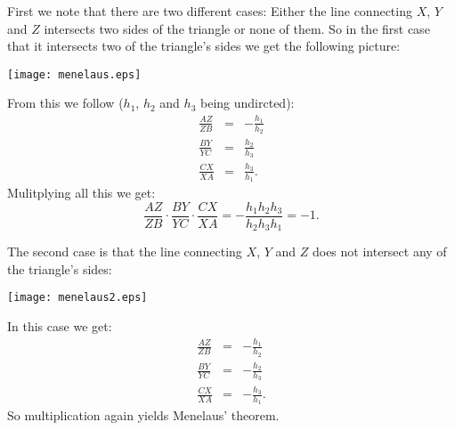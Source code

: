\documentclass[12pt]{article}
\begin{document}
First we note that there are two different cases: Either the line connecting $X$, $Y$ and $Z$ intersects two sides of the triangle or none of them. So in the first case that it intersects two of the triangle's sides we get the following picture:
\begin{center}
\texttt{[image: menelaus.eps]}
\end{center}
From this we follow ($h_1$, $h_2$ and $h_3$ being undircted):
\begin{eqnarray*}
\frac{AZ}{ZB}& = &-\frac{h_1}{h_2}\\
\frac{BY}{YC} & = & \frac{h_2}{h_3}\\
\frac{CX}{XA} & = & \frac{h_3}{h_1}.
\end{eqnarray*}
Mulitplying all this we get:
$$\frac{AZ}{ZB}\cdot\frac{BY}{YC}\cdot\frac{CX}{XA} = -\frac{h_1h_2h_3}{h_2h_3h_1} = -1.$$

The second case is that the line connecting $X$, $Y$ and $Z$ does not intersect any of the triangle's sides:
\begin{center}
\texttt{[image: menelaus2.eps]}
\end{center}
In this case we get:
\begin{eqnarray*}
\frac{AZ}{ZB}&=&-\frac{h_1}{h_2}\\
\frac{BY}{YC}&=&-\frac{h_2}{h_3}\\
\frac{CX}{XA}&=&-\frac{h_3}{h_1}.
\end{eqnarray*}
So multiplication again yields Menelaus' theorem.
\end{document}
